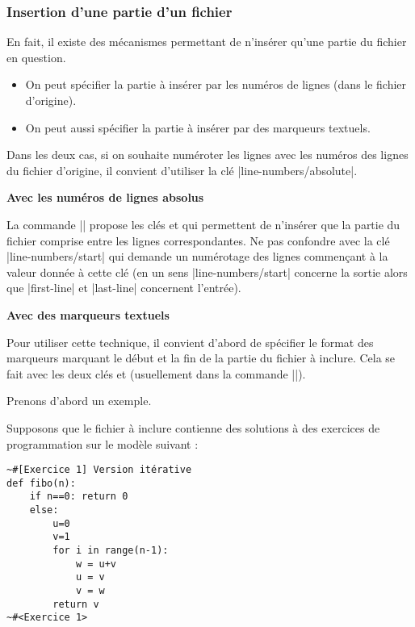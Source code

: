 \documentclass[dvipsnames,svgnames]{article}
\begin{document}
\subsubsection{Insertion d'une partie d'un fichier}

\label{part-of-a-file}

En fait, il existe des mécanismes permettant de n'insérer qu'une partie du fichier en
question.
\begin{itemize}
\item On peut spécifier la partie à insérer par les numéros de lignes (dans le fichier
d'origine).
\item On peut aussi spécifier la partie à insérer par des marqueurs textuels.
\end{itemize}
Dans les deux cas, si on souhaite numéroter les lignes avec les numéros des lignes du
fichier d'origine, il convient d'utiliser la clé |line-numbers/absolute|.

\bigskip
\textbf{Avec les numéros de lignes absolus}\par\nobreak

La commande |\PitonInputFile| propose les clés  et
 qui permettent de n'insérer que la partie du fichier comprise entre
les lignes correspondantes. Ne pas confondre avec la clé |line-numbers/start| qui demande
un numérotage des lignes commençant à la valeur donnée à cette clé (en un sens
|line-numbers/start| concerne la sortie alors que |first-line| et |last-line| concernent
l'entrée).

\bigskip
\textbf{Avec des marqueurs textuels}\par\nobreak



Pour utiliser cette technique, il convient d'abord de spécifier le format des marqueurs
marquant le début et la fin de la partie du fichier à inclure. Cela se fait avec les deux
clés  et  (usuellement dans la
commande |\PitonOptions|).

\medskip
Prenons d'abord un exemple.

\medskip
Supposons que le fichier à inclure contienne des solutions à des exercices de
programmation sur le modèle suivant :

\begin{Verbatim}[formatcom=\small\color{gray}]
~#[Exercice 1] Version itérative
def fibo(n):
    if n==0: return 0 
    else:
        u=0
        v=1
        for i in range(n-1):
            w = u+v
            u = v
            v = w
        return v
~#<Exercice 1>
\end{Verbatim}
\end{document}
